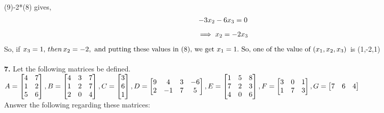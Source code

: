 \documentclass{article}
\begin{document}
(9)-2*(8) gives,\\
\begin{align}
-3x\textsubscript{2}-6x\textsubscript{3}=0
\end{align}
\begin{align*}\implies x\textsubscript{2}=-2x\textsubscript{3}
\end{align*} 
So, if $x\textsubscript{3} =1,\, then\, x\textsubscript{2} = -2,\text{ and putting these values in (8), we get }x\textsubscript{1} =1.\text{ So, one of the value of } (x\textsubscript{1},x\textsubscript{2},x\textsubscript{3})$ is  (1,-2,1) \\ \\
\textbf{7. }Let the following matrices be defined.\\
$\\A = 
\left[
\begin{matrix}
4 &7\\
1&2\\
5&6
\end{matrix}
\right], B = 
\left[
\begin{matrix}
4 &3&7\\
1&2&7\\
2&0&4
\end{matrix}
\right], C = 
\left[
\begin{matrix}
3\\
6\\
1
\end{matrix}
\right], D = 
\left[
\begin{matrix}
9&4 &3&-6\\
2&-1&7&5
\end{matrix}
\right], E = 
\left[
\begin{matrix}
1&5&8\\
7&2&3\\
4&0&6
\end{matrix}
\right],\\ \\ \\F = 
\left[
\begin{matrix}
3&0&1\\
1&7&3\\
\end{matrix}
\right], G = 
\left[
\begin{matrix}
7&6&4
\end{matrix}
\right]\\$\\
Answer the following regarding these matrices:\\ \\
\end{document}
